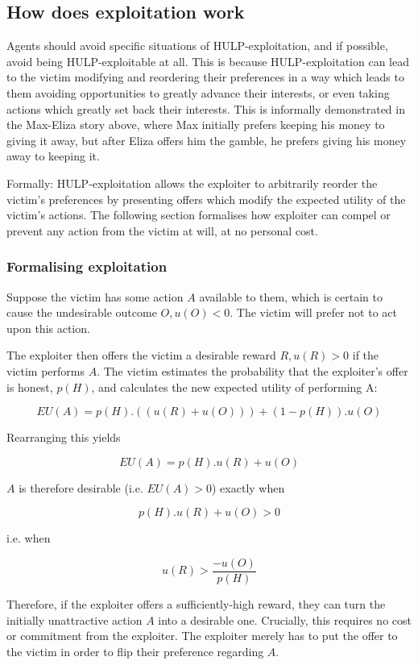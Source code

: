 \documentclass{article}
\begin{document}
\subsection{How does exploitation work}

Agents should avoid specific situations of HULP-exploitation, and if possible, avoid being HULP-exploitable at all. This is because HULP-exploitation can lead to the victim modifying and reordering their preferences in a way which leads to them avoiding opportunities to greatly advance their interests, or even taking actions which greatly set back their interests. This is informally demonstrated in the Max-Eliza story above, where Max initially prefers keeping his money to giving it away, but after Eliza offers him the gamble, he prefers giving his money away to keeping it.

Formally: HULP-exploitation allows the exploiter to arbitrarily reorder the victim's preferences by presenting offers which modify the expected utility of the victim's actions. The following section formalises how exploiter can compel or prevent any action from the victim at will, at no personal cost. 

\subsubsection{Formalising exploitation}

Suppose the victim has some action \(A\) available to them, which is certain to cause the undesirable outcome \(O, u(O) < 0\). The victim will prefer not to act upon this action.

The exploiter then offers the victim a desirable reward \(R, u(R) > 0\) if the victim performs \(A\). The victim estimates the probability that the exploiter's offer is honest, \(p(H)\), and calculates the new expected utility of performing A:

\[EU(A) = p(H).((u(R)+u(O))) + (1-p(H)).u(O)\]

Rearranging this yields

\[EU(A) = p(H).u(R) + u(O)\]

\(A\) is therefore desirable (i.e. \(EU(A)>0\)) exactly when

\[p(H).u(R) + u(O) > 0\]

i.e. when

\[u(R) > \frac{-u(O)}{p(H)}\]

Therefore, if the exploiter offers a sufficiently-high reward, they can turn the initially unattractive action \(A\) into a desirable one. Crucially, this requires no cost or commitment from the exploiter. The exploiter merely has to put the offer to the victim in order to flip their preference regarding \(A\).
\end{document}
